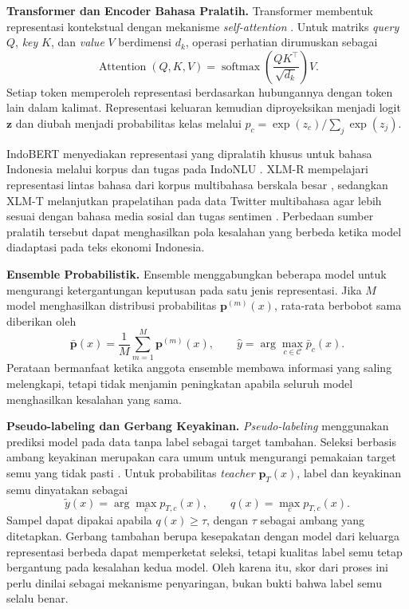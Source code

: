 \textbf{Transformer dan Encoder Bahasa Pralatih.} Transformer membentuk representasi kontekstual dengan mekanisme \textit{self-attention} \cite{vaswani17}. Untuk matriks \textit{query} $Q$, \textit{key} $K$, dan \textit{value} $V$ berdimensi $d_k$, operasi perhatian dirumuskan sebagai
\begin{equation}
\operatorname{Attention}(Q,K,V)=
\operatorname{softmax}\!\left(\frac{QK^{\top}}{\sqrt{d_k}}\right)V.
\end{equation}
Setiap token memperoleh representasi berdasarkan hubungannya dengan token lain dalam kalimat. Representasi keluaran kemudian diproyeksikan menjadi logit $\mathbf{z}$ dan diubah menjadi probabilitas kelas melalui $p_c=\exp(z_c)/\sum_j\exp(z_j)$.

IndoBERT menyediakan representasi yang dipralatih khusus untuk bahasa Indonesia melalui korpus dan tugas pada IndoNLU \cite{wilie20}. XLM-R mempelajari representasi lintas bahasa dari korpus multibahasa berskala besar \cite{conneau20}, sedangkan XLM-T melanjutkan prapelatihan pada data Twitter multibahasa agar lebih sesuai dengan bahasa media sosial dan tugas sentimen \cite{barbieri22}. Perbedaan sumber pralatih tersebut dapat menghasilkan pola kesalahan yang berbeda ketika model diadaptasi pada teks ekonomi Indonesia.

\textbf{Ensemble Probabilistik.} Ensemble menggabungkan beberapa model untuk mengurangi ketergantungan keputusan pada satu jenis representasi. Jika $M$ model menghasilkan distribusi probabilitas $\mathbf{p}^{(m)}(x)$, rata-rata berbobot sama diberikan oleh
\begin{equation}
\bar{\mathbf{p}}(x)=\frac{1}{M}\sum_{m=1}^{M}\mathbf{p}^{(m)}(x),
\qquad
\hat{y}=\arg\max_{c\in\mathcal{C}}\bar{p}_c(x).
\end{equation}
Perataan bermanfaat ketika anggota ensemble membawa informasi yang saling melengkapi, tetapi tidak menjamin peningkatan apabila seluruh model menghasilkan kesalahan yang sama.

\textbf{Pseudo-labeling dan Gerbang Keyakinan.} \textit{Pseudo-labeling} menggunakan prediksi model pada data tanpa label sebagai target tambahan. Seleksi berbasis ambang keyakinan merupakan cara umum untuk mengurangi pemakaian target semu yang tidak pasti \cite{sohn20}. Untuk probabilitas \textit{teacher} $\mathbf{p}_T(x)$, label dan keyakinan semu dinyatakan sebagai
\begin{equation}
\tilde{y}(x)=\arg\max_c p_{T,c}(x),\qquad
q(x)=\max_c p_{T,c}(x).
\end{equation}
Sampel dapat dipakai apabila $q(x)\geq\tau$, dengan $\tau$ sebagai ambang yang ditetapkan. Gerbang tambahan berupa kesepakatan dengan model dari keluarga representasi berbeda dapat memperketat seleksi, tetapi kualitas label semu tetap bergantung pada kesalahan kedua model. Oleh karena itu, skor dari proses ini perlu dinilai sebagai mekanisme penyaringan, bukan bukti bahwa label semu selalu benar.

